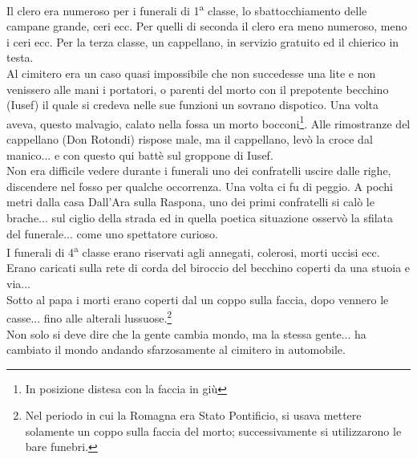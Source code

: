 \indent Il clero era numeroso per i funerali di 1\textsuperscript{a} classe, lo sbattocchiamento delle campane grande, ceri ecc. Per quelli di seconda il clero era meno numeroso, meno i ceri ecc. Per la terza classe, un cappellano, in servizio gratuito ed il chierico in testa.\\
\indent Al cimitero era un caso quasi impossibile che non succedesse una lite e non venissero alle mani i portatori, o parenti del morto con il prepotente becchino (Iusef) il quale si credeva nelle sue funzioni un sovrano dispotico. Una volta aveva, questo malvagio, calato nella fossa un morto bocconi\footnote{In posizione distesa con la faccia in giù}. Alle rimostranze del cappellano (Don Rotondi) rispose male, ma il cappellano, levò la croce dal manico... e con questo qui battè sul groppone di Iusef.\\
\indent Non era difficile vedere durante i funerali uno dei confratelli uscire dalle righe, discendere nel fosso per qualche occorrenza. Una volta ci fu di peggio. A pochi metri dalla casa Dall'Ara sulla  Raspona, uno dei primi confratelli si calò le brache... sul ciglio della strada ed in quella poetica situazione osservò la sfilata del funerale... come uno spettatore curioso.\\
\indent I funerali di 4\textsuperscript{a} classe erano riservati agli annegati, colerosi, morti uccisi ecc. Erano caricati sulla rete di corda del biroccio del becchino coperti da una stuoia e via...\\
\indent Sotto al papa i morti erano coperti dal un coppo sulla faccia, dopo vennero le casse... fino alle alterali lussuose.\footnote{Nel periodo in cui la Romagna era Stato Pontificio, si usava mettere solamente un coppo sulla faccia del morto; successivamente si utilizzarono le bare funebri.}\\
\indent Non solo si deve dire che la gente cambia mondo, ma la stessa gente... ha cambiato il mondo andando sfarzosamente al cimitero in automobile. 

















































%